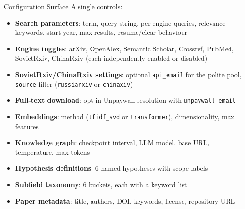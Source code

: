 \documentclass[
  ignorenonframetext,
]{beamer}
\providecommand{\tightlist}{%
  \setlength{\itemsep}{0pt}\setlength{\parskip}{0pt}}
\begin{document}
\begin{frame}{Configuration Surface}
\protect{}\label{configuration-surface}
A single  controls:

\begin{itemize}
\tightlist
\item
  \textbf{Search parameters}: term, query string, per-engine queries,
  relevance keywords, start year, max results, resume/clear behaviour
\item
  \textbf{Engine toggles}: arXiv, OpenAlex, Semantic Scholar, Crossref,
  PubMed, SovietRxiv, ChinaRxiv (each independently enabled or disabled)
\item
  \textbf{SovietRxiv/ChinaRxiv settings}: optional \texttt{api\_email}
  for the polite pool, \texttt{source} filter (\texttt{russiarxiv} or
  \texttt{chinaxiv})
\item
  \textbf{Full-text download}: opt-in Unpaywall resolution with
  \texttt{unpaywall\_email}
\item
  \textbf{Embeddings}: method (\texttt{tfidf\_svd} or
  \texttt{transformer}), dimensionality, max features
\item
  \textbf{Knowledge graph}: checkpoint interval, LLM model, base URL,
  temperature, max tokens
\item
  \textbf{Hypothesis definitions}: 6 named hypotheses with scope labels
\item
  \textbf{Subfield taxonomy}: 6 buckets, each with a keyword list
\item
  \textbf{Paper metadata}: title, authors, DOI, keywords, license,
  repository URL
\end{itemize}
\end{frame}
\end{document}
